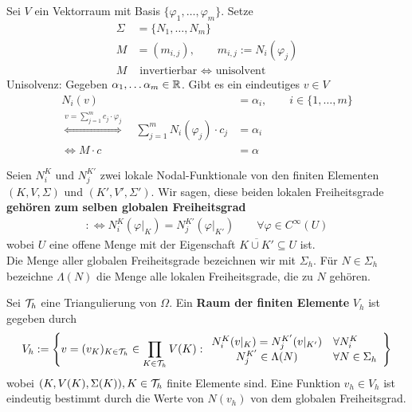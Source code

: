Sei $V$ ein Vektorraum mit Basis $\lbrace\varphi_1,\ldots,\varphi_m\rbrace$. Setze
\begin{align*}
	\Sigma&=\lbrace N_1,\ldots,N_m\rbrace\\
	M&=(m_{i,j}),\qquad m_{i,j}:=N_i(\varphi_j)\\
	M&\text{ invertierbar }\Longleftrightarrow \text{ unisolvent}
\end{align*}
Unisolvenz: Gegeben $\alpha_1,\ldots\alpha_m\in\mathbb{R}$. Gibt es ein eindeutiges $v\in V$
\begin{align*}
	N_i(v)&=\alpha_i,\qquad i\in\lbrace1,\ldots,m\rbrace\\
	\stackrel{v=\sum\limits_{j=1}^m c_j\cdot\varphi_j}{\Longleftrightarrow}\quad
	\sum\limits_{j=1}^m N_i(\varphi_j)\cdot c_j&=\alpha_i\\
	\Longleftrightarrow
	M\cdot c&=\alpha
\end{align*}

\begin{definition}\enter
	Seien $N_i^K$ und $N_j^{K'}$ zwei lokale Nodal-Funktionale von den finiten Elementen $(K,V,\Sigma)$ und $(K',V',\Sigma')$.
	Wir sagen, diese beiden lokalen Freiheitsgrade \textbf{gehören zum selben globalen Freiheitsgrad}
	\begin{align*}
		:\Longleftrightarrow N_i^K(\varphi|_K)=N_j^{K'}(\varphi|_{K'})\qquad\forall\varphi\in C^\infty(U)
	\end{align*}
	wobei $U$ eine offene Menge mit der Eigenschaft $\overline{K\cup K'}\subseteq U$ ist.\\
	Die Menge aller globalen Freiheitsgrade bezeichnen wir mit $\Sigma_h$.
	Für $N\in\Sigma_h$ bezeichne $\Lambda(N)$ die Menge alle lokalen Freiheitsgrade, die zu $N$ gehören.
\end{definition}

\begin{definition}\enter
	Sei $\mathcal{T}_h$ eine Triangulierung von $\Omega$. Ein \textbf{Raum der finiten Elemente} $V_h$ ist gegeben durch
	\begin{align*}
		V_h:=\left\lbrace v=(v_{K})_{K\in\mathcal{T}_h}\in\prod\limits_{K\in\mathcal{T}_h} V(K):
		\begin{array}{cl}
			N_i^K(v|_K)=N_j^{K'}(v|_{K'}) &\forall N_i^K\\
			N_j^{K'}\in\Lambda(N) &\forall N\in\Sigma_h
		\end{array}
		\right\rbrace
	\end{align*}
	wobei $(K,V(K),\Sigma(K)),K\in\mathcal{T}_h$ finite Elemente sind.
	Eine Funktion $v_h\in V_h$ ist eindeutig bestimmt durch die Werte von $N(v_h)$ von dem globalen Freiheitsgrad.
\end{definition}

